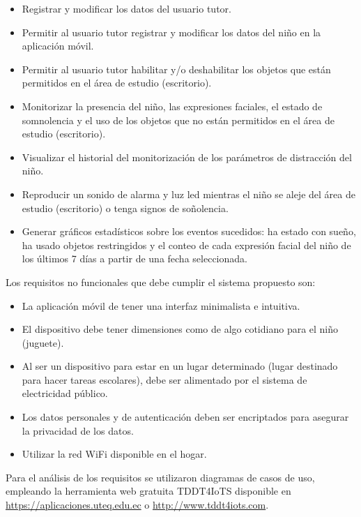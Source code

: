 \documentclass[a4paper,fleqn]{cas-sc}
\begin{document}
					\begin{itemize}
						\item Registrar y modificar los datos del usuario tutor.
						\item Permitir al usuario tutor registrar y modificar los datos del niño en la aplicación móvil.
						\item Permitir al usuario tutor habilitar y/o deshabilitar los objetos que están permitidos en el área de estudio (escritorio).
						\item Monitorizar la presencia del niño, las expresiones faciales, el estado de somnolencia y el uso de los objetos que no están permitidos en el área de estudio (escritorio).
						\item Visualizar el historial del monitorización de los parámetros de distracción del niño.
						\item Reproducir un sonido de alarma y luz led mientras el niño se aleje del área de estudio (escritorio) o tenga signos de soñolencia.
						\item Generar gráficos estadísticos sobre los eventos sucedidos: ha estado con sueño, ha usado objetos restringidos y el conteo de cada expresión facial del niño de los últimos 7 días a partir de una fecha seleccionada.
					\end{itemize}
					
					Los requisitos no funcionales que debe cumplir el sistema propuesto son:
					
					\begin{itemize}
						\item La aplicación móvil de tener una interfaz minimalista e intuitiva.
						\item El dispositivo debe tener dimensiones como de algo cotidiano para el niño (juguete).
						\item Al ser un dispositivo para estar en un lugar determinado (lugar destinado para hacer tareas escolares), debe ser alimentado por el sistema de electricidad público.
						\item Los datos personales y de autenticación deben ser encriptados para asegurar la privacidad de los datos.
						\item Utilizar la red WiFi disponible en el hogar.
					\end{itemize}
					
					Para el análisis de los requisitos se utilizaron diagramas de casos de uso, empleando la herramienta web gratuita TDDT4IoTS disponible en \href{https://aplicaciones.uteq.edu.ec}{https://aplicaciones.uteq.edu.ec} o \href{http://www.tddt4iots.com}{http://www.tddt4iots.com}. 
					
\end{document}
